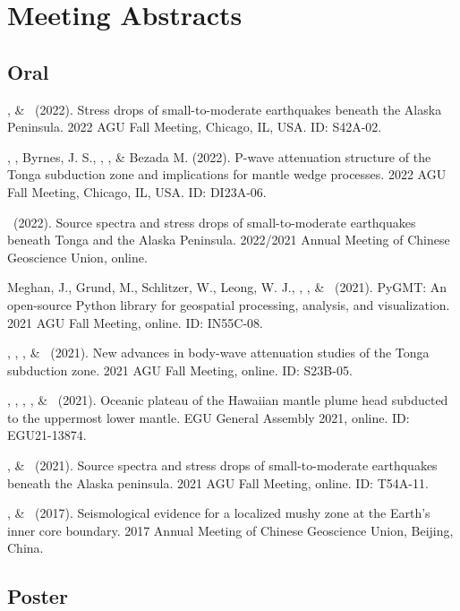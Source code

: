 \section{Meeting Abstracts}

\subsection{Oral}

\begin{etaremune}
\item
    \SWei, \& \Me\ (2022).
    Stress drops of small-to-moderate earthquakes beneath the Alaska Peninsula.
    2022 AGU Fall Meeting, Chicago, IL, USA. ID: S42A-02.
\item
    \YZhang, \SWei, Byrnes, J. S., \Me, \FWang, \& Bezada M. (2022).
    P-wave attenuation structure of the Tonga subduction zone and implications for mantle wedge processes.
    2022 AGU Fall Meeting, Chicago, IL, USA. ID: DI23A-06.
\item
    \Me\ (2022).
    Source spectra and stress drops of small-to-moderate earthquakes beneath Tonga and the Alaska Peninsula.
    2022/2021 Annual Meeting of Chinese Geoscience Union, online.
\item
    Meghan, J., Grund, M., Schlitzer, W., Leong, W. J., \Me, \JYao, \& \LUieda\ (2021).
    PyGMT: An open-source Python library for geospatial processing, analysis, and visualization.
    2021 AGU Fall Meeting, online. ID: IN55C-08.
\item
    \SWei, \YZhang, \Me, \& \DWiens\ (2021).
    New advances in body-wave attenuation studies of the Tonga subduction zone.
    2021 AGU Fall Meeting, online. ID: S23B-05.
\item
    \SWei, \PShearer, \CLithgowBertelloni, \LStixrude, \& \Me\ (2021).
    Oceanic plateau of the Hawaiian mantle plume head subducted to the uppermost lower mantle.
    EGU General Assembly 2021, online. ID: EGU21-13874.
\item
    \Me, \& \SWei\ (2021).
    Source spectra and stress drops of small-to-moderate earthquakes beneath the Alaska peninsula.
    2021 AGU Fall Meeting, online. ID: T54A-11.
\item
    \Me, \& \LWen\ (2017).
    Seismological evidence for a localized mushy zone at the Earth's inner core boundary.
    2017 Annual Meeting of Chinese Geoscience Union, Beijing, China.
\end{etaremune}

\subsection{Poster}

